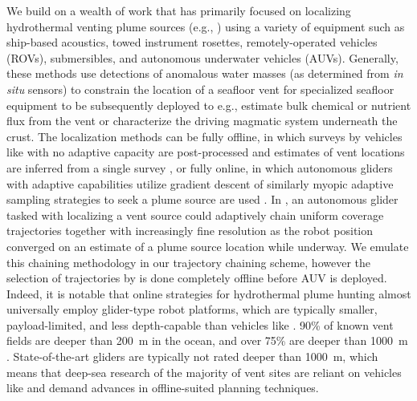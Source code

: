 We build on a wealth of work that has primarily focused on localizing hydrothermal venting plume sources (e.g., \cite{jakuba2007stochastic, mcgill2011robot, nakamura2013discovery, paduan2018discovery, mason2020evaluation, wang20203, kim2020discovery,ferri2010novel}) using a variety of equipment such as ship-based acoustics, towed instrument rosettes, remotely-operated vehicles (ROVs), submersibles, and autonomous underwater vehicles (AUVs). Generally, these methods use detections of anomalous water masses (as determined from \emph{in situ} sensors) to constrain the location of a seafloor vent for specialized seafloor equipment to be subsequently deployed to e.g., estimate bulk chemical or nutrient flux from the vent or characterize the driving magmatic system underneath the crust. The localization methods can be fully offline, in which surveys by vehicles like \Sentry with no adaptive capacity are post-processed and estimates of vent locations are inferred from a single survey \cite{jakuba2007stochastic,nakamura2013discovery}, or fully online, in which autonomous gliders with adaptive capabilities utilize gradient descent of similarly myopic adaptive sampling strategies to seek a plume source are used \cite{wang20203}. In \cite{branch2020demonstration}, an autonomous glider tasked with localizing a vent source could adaptively chain uniform coverage trajectories together with increasingly fine resolution as the robot position converged on an estimate of a plume source location while underway. We emulate this chaining methodology in our trajectory chaining scheme, however the selection of trajectories by \PHORTEX is done completely offline before AUV \Sentry is deployed. Indeed, it is notable that online strategies for hydrothermal plume hunting almost universally employ glider-type robot platforms, which are typically smaller, payload-limited, and less depth-capable than vehicles like \Sentry. 90\% of known vent fields are deeper than \SI{200}{\meter} in the ocean, and over 75\% are deeper than \SI{1000}{\meter} \cite{beaulieu2013authoritative}. State-of-the-art gliders are typically not rated deeper than \SI{1000}{\meter}, which means that deep-sea research of the majority of vent sites are reliant on vehicles like \Sentry and demand advances in offline-suited planning techniques.

